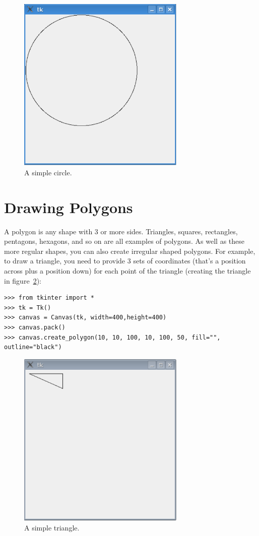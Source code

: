 \begin{figure}
\begin{center}
\includegraphics[width=80mm]{images/figure40}
\end{center}
\caption{A simple circle.}\label{fig40}
\end{figure}

\section{Drawing Polygons}

A polygon is any shape with 3 or more sides. Triangles, squares, rectangles, pentagons, hexagons, and so on are all examples of polygons. As well as these more regular shapes, you can also create irregular shaped polygons. For example, to draw a triangle, you need to provide 3 sets of coordinates (that's a position across plus a position down) for each point of the triangle (creating the triangle in figure~\ref{fig41}):

\begin{Verbatim}[frame=single]
>>> from tkinter import *
>>> tk = Tk()
>>> canvas = Canvas(tk, width=400,height=400)
>>> canvas.pack()
>>> canvas.create_polygon(10, 10, 100, 10, 100, 50, fill="", outline="black")
\end{Verbatim}

\begin{figure}
\begin{center}
\includegraphics[width=80mm]{images/figure41}
\end{center}
\caption{A simple triangle.}\label{fig41}
\end{figure}

